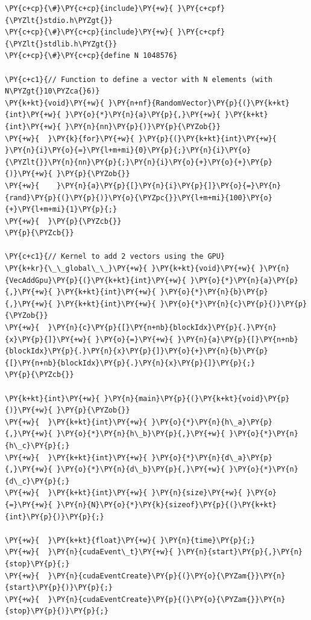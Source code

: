 \begin{Verbatim}[label=\makebox{\url{https://github.com/lucabaldini/cmepda/tree/master/slides/latex/snippets/cuda_vec_add_gpu.cu}},commandchars=\\\{\}]
\PY{c+cp}{\#}\PY{c+cp}{include}\PY{+w}{ }\PY{c+cpf}{\PYZlt{}stdio.h\PYZgt{}}
\PY{c+cp}{\#}\PY{c+cp}{include}\PY{+w}{ }\PY{c+cpf}{\PYZlt{}stdlib.h\PYZgt{}}
\PY{c+cp}{\#}\PY{c+cp}{define N 1048576}

\PY{c+c1}{// Function to define a vector with N elements (with N\PYZgt{}10\PYZca{}6)}
\PY{k+kt}{void}\PY{+w}{ }\PY{n+nf}{RandomVector}\PY{p}{(}\PY{k+kt}{int}\PY{+w}{ }\PY{o}{*}\PY{n}{a}\PY{p}{,}\PY{+w}{ }\PY{k+kt}{int}\PY{+w}{ }\PY{n}{nn}\PY{p}{)}\PY{p}{\PYZob{}}
\PY{+w}{  }\PY{k}{for}\PY{+w}{ }\PY{p}{(}\PY{k+kt}{int}\PY{+w}{ }\PY{n}{i}\PY{o}{=}\PY{l+m+mi}{0}\PY{p}{;}\PY{n}{i}\PY{o}{\PYZlt{}}\PY{n}{nn}\PY{p}{;}\PY{n}{i}\PY{o}{+}\PY{o}{+}\PY{p}{)}\PY{+w}{ }\PY{p}{\PYZob{}}
\PY{+w}{    }\PY{n}{a}\PY{p}{[}\PY{n}{i}\PY{p}{]}\PY{o}{=}\PY{n}{rand}\PY{p}{(}\PY{p}{)}\PY{o}{\PYZpc{}}\PY{l+m+mi}{100}\PY{o}{+}\PY{l+m+mi}{1}\PY{p}{;}
\PY{+w}{  }\PY{p}{\PYZcb{}}
\PY{p}{\PYZcb{}}

\PY{c+c1}{// Kernel to add 2 vectors using the GPU}
\PY{k+kr}{\_\_global\_\_}\PY{+w}{ }\PY{k+kt}{void}\PY{+w}{ }\PY{n}{VecAddGpu}\PY{p}{(}\PY{k+kt}{int}\PY{+w}{ }\PY{o}{*}\PY{n}{a}\PY{p}{,}\PY{+w}{ }\PY{k+kt}{int}\PY{+w}{ }\PY{o}{*}\PY{n}{b}\PY{p}{,}\PY{+w}{ }\PY{k+kt}{int}\PY{+w}{ }\PY{o}{*}\PY{n}{c}\PY{p}{)}\PY{p}{\PYZob{}}
\PY{+w}{  }\PY{n}{c}\PY{p}{[}\PY{n+nb}{blockIdx}\PY{p}{.}\PY{n}{x}\PY{p}{]}\PY{+w}{ }\PY{o}{=}\PY{+w}{ }\PY{n}{a}\PY{p}{[}\PY{n+nb}{blockIdx}\PY{p}{.}\PY{n}{x}\PY{p}{]}\PY{o}{+}\PY{n}{b}\PY{p}{[}\PY{n+nb}{blockIdx}\PY{p}{.}\PY{n}{x}\PY{p}{]}\PY{p}{;}
\PY{p}{\PYZcb{}}

\PY{k+kt}{int}\PY{+w}{ }\PY{n}{main}\PY{p}{(}\PY{k+kt}{void}\PY{p}{)}\PY{+w}{ }\PY{p}{\PYZob{}}
\PY{+w}{  }\PY{k+kt}{int}\PY{+w}{ }\PY{o}{*}\PY{n}{h\_a}\PY{p}{,}\PY{+w}{ }\PY{o}{*}\PY{n}{h\_b}\PY{p}{,}\PY{+w}{ }\PY{o}{*}\PY{n}{h\_c}\PY{p}{;}
\PY{+w}{  }\PY{k+kt}{int}\PY{+w}{ }\PY{o}{*}\PY{n}{d\_a}\PY{p}{,}\PY{+w}{ }\PY{o}{*}\PY{n}{d\_b}\PY{p}{,}\PY{+w}{ }\PY{o}{*}\PY{n}{d\_c}\PY{p}{;}
\PY{+w}{  }\PY{k+kt}{int}\PY{+w}{ }\PY{n}{size}\PY{+w}{ }\PY{o}{=}\PY{+w}{ }\PY{n}{N}\PY{o}{*}\PY{k}{sizeof}\PY{p}{(}\PY{k+kt}{int}\PY{p}{)}\PY{p}{;}

\PY{+w}{  }\PY{k+kt}{float}\PY{+w}{ }\PY{n}{time}\PY{p}{;}
\PY{+w}{  }\PY{n}{cudaEvent\_t}\PY{+w}{ }\PY{n}{start}\PY{p}{,}\PY{n}{stop}\PY{p}{;}
\PY{+w}{  }\PY{n}{cudaEventCreate}\PY{p}{(}\PY{o}{\PYZam{}}\PY{n}{start}\PY{p}{)}\PY{p}{;}
\PY{+w}{  }\PY{n}{cudaEventCreate}\PY{p}{(}\PY{o}{\PYZam{}}\PY{n}{stop}\PY{p}{)}\PY{p}{;}


\end{Verbatim}
